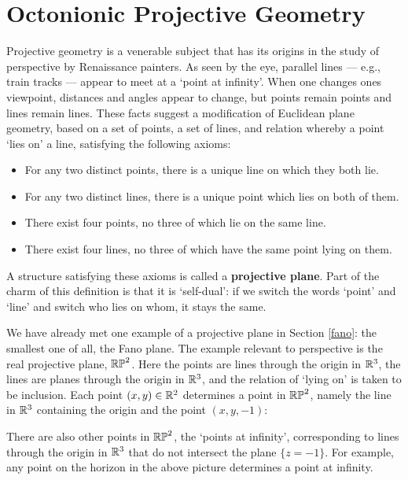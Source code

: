 \section{Octonionic Projective Geometry}   \label{proj} 
 
Projective geometry is a venerable subject that has its origins in the 
study of perspective by Renaissance painters.  As seen by the eye, 
parallel lines --- e.g., train tracks --- appear to meet at a `point at 
infinity'.  When one changes ones viewpoint, distances and angles appear 
to change, but points remain points and lines remain lines.  These facts 
suggest a modification of Euclidean plane geometry, based on a set of 
points, a set of lines, and relation whereby a point `lies on' a line, 
satisfying the following axioms: 
\begin{itemize} 
\item For any two distinct points, there is a unique line on which they 
both lie. 
\item For any two distinct lines, there is a unique point which lies on 
both of them. 
\item There exist four points, no three of which lie on the same line. 
\item There exist four lines, no three of which have the same point lying 
on them.   
\end{itemize} 
A structure satisfying these axioms is called a {\bf projective plane}. 
Part of the charm of this definition is that it is `self-dual': if we 
switch the words `point' and `line' and switch who lies on whom, it 
stays the same.   
 
We have already met one example of a projective plane in Section  
\ref{fano}: the smallest one of all, the Fano plane.  The example 
relevant to perspective is the real projective plane, ${\mathbb {RP}}^2$.  Here the 
points are lines through the origin in ${\mathbb R}^3$, the lines are planes 
through the origin in ${\mathbb R}^3$, and the relation of `lying on' is taken to 
be inclusion.  Each point $(x,y) \in {\mathbb R}^2$ determines a point in 
${\mathbb {RP}}^2$, namely the line in ${\mathbb R}^3$ containing the origin and the point 
$(x,y,-1)$:

\centerline{\epsfysize=2in}   
\label{plane}   

\noindent
There are also other points in ${\mathbb {RP}}^2$, the `points at infinity',
corresponding to lines through the origin in ${\mathbb R}^3$ that do not
intersect the plane $\{z = -1\}$.   For example, any point on the 
horizon in the above picture determines a point at infinity. 
 
